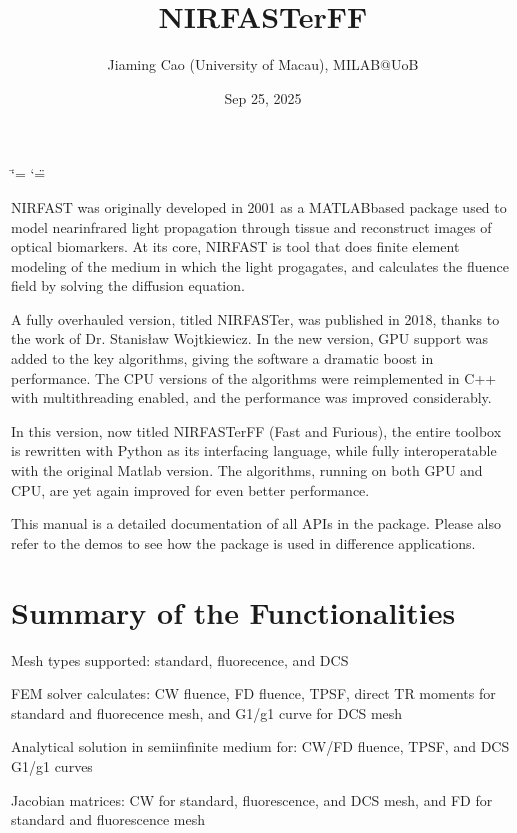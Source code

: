 \documentclass[letterpaper,10pt,english]{sphinxmanual}
\title{NIRFASTerFF}
\date{Sep 25, 2025}
\author{Jiaming Cao (University of Macau), MILAB@UoB}
\begin{document}
\ifdefined\shorthandoff
  \ifnum\catcode`\=\string=\active\shorthandoff{=}\fi
  \ifnum\catcode`\"=\active{}\fi
\fi

\pagestyle{empty}
\sphinxmaketitle
\pagestyle{plain}
\sphinxtableofcontents
\pagestyle{normal}
\label{\detokenize{index::doc}}


\sphinxAtStartPar
NIRFAST was originally developed in 2001 as a MATLAB\sphinxhyphen{}based package used to model near\sphinxhyphen{}infrared light propagation through tissue and reconstruct images of optical biomarkers. At its core, NIRFAST is tool that does finite element modeling of the medium in which the light progagates, and calculates the fluence field by solving the diffusion equation.

\sphinxAtStartPar
A fully overhauled version, titled NIRFASTer, was published in 2018, thanks to the work of Dr. Stanisław Wojtkiewicz. In the new version, GPU support was added to the key algorithms, giving the software a dramatic boost in performance. The CPU versions of the algorithms were re\sphinxhyphen{}implemented in C++ with multithreading enabled, and the performance was improved considerably.

\sphinxAtStartPar
In this version, now titled NIRFASTerFF (Fast and Furious), the entire toolbox is re\sphinxhyphen{}written with Python as its interfacing language, while fully inter\sphinxhyphen{}operatable with the original Matlab version. The algorithms, running on both GPU and CPU, are yet again improved for even better performance.

\sphinxAtStartPar
This manual is a detailed documentation of all APIs in the package. Please also refer to the demos to see how the package is used in difference applications.


\chapter{Summary of the Functionalities}
\label{\detokenize{index:summary-of-the-functionalities}}
\sphinxAtStartPar
Mesh types supported: standard, fluorecence, and DCS

\sphinxAtStartPar
FEM solver calculates: CW fluence, FD fluence, TPSF, direct TR moments for standard and fluorecence mesh, and G1/g1 curve for DCS mesh

\sphinxAtStartPar
Analytical solution in semi\sphinxhyphen{}infinite medium for: CW/FD fluence, TPSF, and DCS G1/g1 curves

\sphinxAtStartPar
Jacobian matrices: CW for standard, fluorescence, and DCS mesh, and FD for standard and fluorescence mesh
\end{document}
